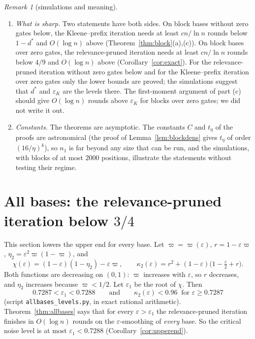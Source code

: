 \documentclass[11pt]{amsart}
\theoremstyle{definition}
\theoremstyle{remark}
\newtheorem{remark}[theorem]{Remark}
\newcommand{\eps}{\varepsilon}
\begin{document}
\begin{remark}[simulations and meaning]
\begin{enumerate}[label=(\roman*),leftmargin=2.4em]
(Theorem~\ref{thm:blockabove}); the construction of Section~\ref{sec:latch} is not proved to fail
there, and below the level $\eps_1<0.7288$ of Section~\ref{sec:allbases} nothing is proved to work
for all bases. The construction of
Section~\ref{sec:s24} goes past $4/9$: up to $0.4468$ no such algorithm exists either, unless
$\mathrm P\subseteq\mathrm{BPNC}$, while the relevance-pruned iteration is fast on random block
bases above $4/9$ (Remark~\ref{rem:s24}(i)).
\item \emph{What is sharp.} Two statements have both sides. On block bases without zero gates
below, the Kleene--prefix iteration needs at least $cn/\ln n$ rounds below $1-d^*$ and
$O(\log n)$ above (Theorem~\ref{thm:block}(a),(c)). On block bases over zero gates, the
relevance-pruned iteration needs at least $cn/\ln n$ rounds below $4/9$ and $O(\log n)$ above
(Corollary~\ref{cor:exact}). For the relevance-pruned iteration without zero gates below and for
the Kleene--prefix iteration over zero gates only the lower bounds are proved; the simulations
suggest that $d^*$ and $\eps_K$ are the levels there. The first-moment argument of part (c) should give $O(\log n)$
rounds above $\eps_K$ for blocks over zero gates; we did not write it out.
\item \emph{Constants.} The theorems are asymptotic. The constants $C$ and $t_\eta$ of the proofs
are astronomical (the proof of Lemma~\ref{lem:blockdens} gives $t_\eta$ of order
$(16/\eta)^k$), so $n_1$ is far beyond any size that can be run, and the simulations, with blocks
of at most $2000$ positions, illustrate the statements without testing their regime.
\end{enumerate}
\end{remark}

\section{All bases: the relevance-pruned iteration below \texorpdfstring{$3/4$}{3/4}}\label{sec:allbases}

This section lowers the upper end for every base. Let $\varpi=\varpi(\eps)$, $r=1-\eps\varpi$,
$\eta_2=\eps^2\varpi(1-\varpi)$, and
\[
\chi(\eps)=(1-\eps)(1-\eta_2)-\eps\varpi,\qquad
\kappa_2(\eps)=r^2+(1-\eps)\bigl(1-\tfrac\eps2+r\bigr).
\]
Both functions are decreasing on $(0,1)$: $\varpi$ increases with $\eps$, so $r$ decreases, and
$\eta_2$ increases because $\varpi<1/2$. Let $\eps_1$ be the root of $\chi$. Then
\[
0.7287<\eps_1<0.7288\qquad\text{and}\qquad\kappa_2(\eps)<0.96\ \text{ for }\eps\ge0.7287
\]
(script \texttt{allbases\_levels.py}, in exact rational arithmetic). Theorem~\ref{thm:allbases}
says that for every $\eps>\eps_1$ the relevance-pruned iteration finishes in $O(\log n)$ rounds on
the $\eps$-smoothing of \emph{every} base. So the critical noise level is at most $\eps_1<0.7288$
(Corollary~\ref{cor:upperend}).
\end{document}
